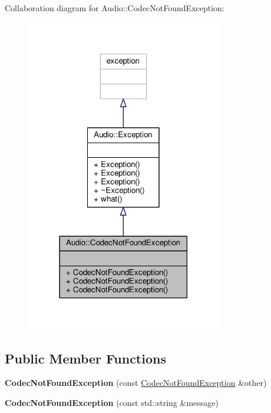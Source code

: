 Collaboration diagram for Audio\+:\+:Codec\+Not\+Found\+Exception\+:
\nopagebreak
\begin{figure}[H]
\begin{center}
\leavevmode
\includegraphics[width=242pt]{dc/d46/classAudio_1_1CodecNotFoundException__coll__graph}
\end{center}
\end{figure}
\subsection*{Public Member Functions}
\begin{DoxyCompactItemize}
\item 
{\bfseries Codec\+Not\+Found\+Exception} (const \hyperlink{classAudio_1_1CodecNotFoundException}{Codec\+Not\+Found\+Exception} \&other)\hypertarget{classAudio_1_1CodecNotFoundException_a0624bea53de29e702d717f6dc3c4ed8a}{}\label{classAudio_1_1CodecNotFoundException_a0624bea53de29e702d717f6dc3c4ed8a}

\item 
{\bfseries Codec\+Not\+Found\+Exception} (const std\+::string \&message)\hypertarget{classAudio_1_1CodecNotFoundException_a99028761bbfc34603386d0bf35e4c162}{}\label{classAudio_1_1CodecNotFoundException_a99028761bbfc34603386d0bf35e4c162}

\end{DoxyCompactItemize}


